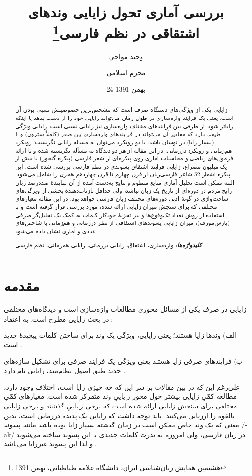 \documentclass[12pt,onecolumn,a4paper]{article}
\providecommand{\keywords}[1]{\textbf{\textit{کلیدواژه‌ها:}} #1}
\begin{document}
    \title{بررسی آماری تحول زایایی وندهای اشتقاقی در نظم فارسی\footnote{هشتمین همایش زبان‌شناسی ایران، دانشگاه علامه طباطبائی، بهمن 1391}}
    \author[1]{وحید مواجی}
    \author[2]{محرم اسلامی}
    \date{24 بهمن 1391}
    \maketitle

    \begin{abstract}
        زایایی یکی از ویژگی‌های دستگاه صرف است که مشخص‌ترین خصوصیتش نسبی بودن آن است. یعنی یک فرایند واژه‌سازی در طول زمان می‌تواند زایایی خود را از دست بدهد یا اینکه زایاتر شود. از طرفی بین فرایندهای مختلف واژه‌سازی نیز زایایی نسبی است. زایایی ویژگی طیفی دارد که مقادیر آن می‌تواند در فرایندهای واژه‌سازی بین صفر (کاملاً سترون) و 1 (بسیار زایا) در نوسان باشد. با دو رویکرد می‌توان به مسأله زایایی نگریست: رویکرد هم‌زمانی و رویکرد درزمانی. در این مقاله از هر دو دیدگاه به مسأله نگریسته شده و با ارائه فرمول‌های ریاضی و محاسبات آماری روی پیکره‌ای از شعر فارسی (پیکره گنجور) با بیش از یک میلیون مصراع، زایایی فرایند اشتقاق پسوندی در نظم فارسی بررسی شده‌ است. این پیکره اشعار 52 شاعر فارسی‌زبان از قرن چهارم تا قرن چهاردهم هجری را شامل می‌شود. البته ممکن است تحلیل آماری منابع منظوم و نتایج به‌دست آمده از آن نمایندهٔ صددرصد زبان رایج مردم در دوره‌ای از تاریخ یک زبان نباشد، ولی حداقل بازتاب‌دهندهٔ بخشی از ویژگی‌های ساخت‌واژی در گونهٔ ادبی دوره‌های مختلف زبان فارسی خواهد بود. در این مقاله معیارهای مختلفی که برای سنجش میزان زایایی ارائه شده، مورد بررسی قرار گرفته است و با استفاده از روش تعداد تک‌وقوع‌ها و نیز تجزیهٔ خودکار کلمات به کمک یک تحلیل‌گر صرفی (پارس‌مورف)، میزان زایایی پسوندهای اشتقاقی از نظر درزمانی و هم‌زمانی با شاخص‌های عددی و آماری نشان داده می‌شود
        \par
        \keywords{واژه‌سازی، اشتقاق، زایایی درزمانی، زایایی هم‌زمانی، نظم فارسی}
    \end{abstract}

    \section{مقدمه}
    زایایی در صرف یکی از مسائل محوری مطالعات واژه‌سازی است و دیدگاه‌های مختلفی در بحث زایایی مطرح است. به اعتقاد :
    \par\noindent
    الف) وندها زایا هستند؛ یعنی زایایی، ویژگی یک وند برای ساختن کلمات پیچیدهٔ جدید است .
    \par\noindent
    ب) فرایندهای صرفی زایا هستند یعنی ویژگی یک فرایند صرفی برای تشکیل سازه‌های جدید طبق اصول نظام‌مند، زایایی نام دارد .
    \par\noindent
    علی‌رغم این که در بین مقالات بر سر این که چه چیزی زایا است، اختلاف وجود دارد، مطالعه کمّیِ زایایی بیشتر حول محور زایاییِ وند متمرکز شده است. معیارهای کمّیِ مختلفی برای سنجش زایایی ارائه شده است که برخی زایاییِ گذشته و برخی زایایی بالقوه را ارزیابی می‌کنند. باید توجه داشت که زایایی یک پدیده درزمانی است، بدین معنی که یک وند خاص ممکن است در زمان گذشته بسیار زایا بوده باشد مانند پسوند /-ak/ در زبان فارسی، ولی امروزه به ندرت کلمات جدیدی با این پسوند ساخته می‌شوند و لذا این پسوند غیرزایا می‌باشد {\mfo\citep{taba_82}}.
\end{document}
